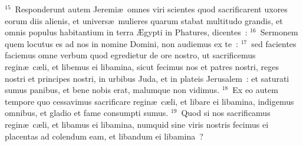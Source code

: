 ${}^{15}$~Responderunt autem Jeremi\ae\ omnes viri scientes quod sacrificarent uxores eorum diis alienis, et univers\ae\ mulieres quarum stabat multitudo grandis, et omnis populus habitantium in terra \AE gypti in Phatures, dicentes~:
${}^{16}$~Sermonem quem locutus es ad nos in nomine Domini, non audiemus ex te~:
${}^{17}$~sed facientes faciemus omne verbum quod egredietur de ore nostro, ut sacrificemus regin\ae\ c\ae li, et libemus ei libamina, sicut fecimus nos et patres nostri, reges nostri et principes nostri, in urbibus Juda, et in plateis Jerusalem~: et saturati sumus panibus, et bene nobis erat, malumque non vidimus.
${}^{18}$~Ex eo autem tempore quo cessavimus sacrificare regin\ae\ c\ae li, et libare ei libamina, indigemus omnibus, et gladio et fame consumpti sumus.
${}^{19}$~Quod si nos sacrificamus regin\ae\ c\ae li, et libamus ei libamina, numquid sine viris nostris fecimus ei placentas ad colendum eam, et libandum ei libamina~?


